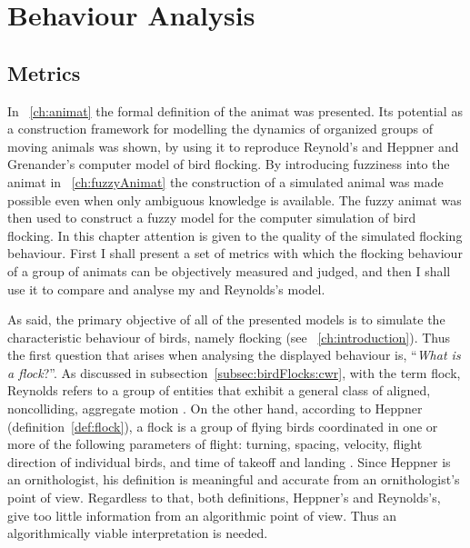 









\chapter{Behaviour Analysis}
\label{ch:analysis}


\section{Metrics}
\label{sec:analysis:metrics}
In \chaptername~\ref{ch:animat} the formal definition of the animat was presented. Its potential as a construction framework for modelling the dynamics of organized groups of moving animals was shown, by using it to reproduce Reynold's \cite{reynolds:1987,reynolds:1999} and Heppner and Grenander's \cite{heppner:1990} computer model of bird flocking. By introducing fuzziness into the animat in \chaptername~\ref{ch:fuzzyAnimat} the construction of a simulated animal was made possible even when only ambiguous knowledge is available. The fuzzy animat was then used to construct a fuzzy model for the computer simulation of bird flocking. In this chapter attention is given to the quality of the simulated flocking behaviour. First I shall present a set of metrics with which the flocking behaviour of a group of animats can be objectively measured and judged, and then I shall use it to compare and analyse my and Reynolds's model.

As said, the primary objective of all of the presented models is to simulate the characteristic behaviour of birds, namely flocking (see \chaptername~\ref{ch:introduction}). Thus the first question that arises when analysing the displayed behaviour is, ``\emph{What is a flock}?''. As discussed in subsection~\ref{subsec:birdFlocks:cwr}, with the term flock, Reynolds refers to a group of entities that exhibit a general class of aligned, noncolliding, aggregate motion \cite{reynolds:1987}. On the other hand, according to Heppner (definition~\ref{def:flock}), a flock is a group of flying birds coordinated in one or more of the following parameters of flight: turning, spacing, velocity, flight direction of individual birds, and time of takeoff and landing \cite{heppner:1974a}. Since Heppner is an ornithologist, his definition is meaningful and accurate from an ornithologist's point of view. Regardless to that, both definitions, Heppner's and Reynolds's, give too little information from an algorithmic point of view. Thus an algorithmically viable interpretation is needed.

